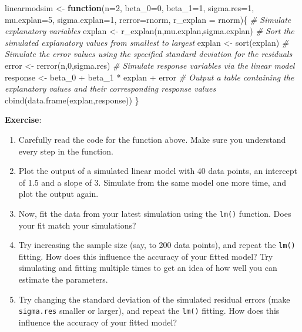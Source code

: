\documentclass[
]{book}
\newenvironment{Shaded}{\begin{snugshade}}{\end{snugshade}}
\newcommand{\AttributeTok}[1]{\textcolor[rgb]{0.77,0.63,0.00}{#1}}
\newcommand{\CommentTok}[1]{\textcolor[rgb]{0.56,0.35,0.01}{\textit{#1}}}
\newcommand{\ControlFlowTok}[1]{\textcolor[rgb]{0.13,0.29,0.53}{\textbf{#1}}}
\newcommand{\DecValTok}[1]{\textcolor[rgb]{0.00,0.00,0.81}{#1}}
\newcommand{\FunctionTok}[1]{\textcolor[rgb]{0.00,0.00,0.00}{#1}}
\newcommand{\NormalTok}[1]{#1}
\newcommand{\OtherTok}[1]{\textcolor[rgb]{0.56,0.35,0.01}{#1}}
\newcommand{\SpecialCharTok}[1]{\textcolor[rgb]{0.00,0.00,0.00}{#1}}
\providecommand{\tightlist}{%
  \setlength{\itemsep}{0pt}\setlength{\parskip}{0pt}}
\begin{document}
\begin{Shaded}
\begin{Highlighting}[]
\NormalTok{linearmodsim }\OtherTok{\textless{}{-}} \ControlFlowTok{function}\NormalTok{(}\AttributeTok{n=}\DecValTok{2}\NormalTok{, }\AttributeTok{beta\_0=}\DecValTok{0}\NormalTok{, }\AttributeTok{beta\_1=}\DecValTok{1}\NormalTok{, }\AttributeTok{sigma.res=}\DecValTok{1}\NormalTok{, }\AttributeTok{mu.explan=}\DecValTok{5}\NormalTok{, }\AttributeTok{sigma.explan=}\DecValTok{1}\NormalTok{, }\AttributeTok{rerror=}\NormalTok{rnorm, }\AttributeTok{r\_explan =}\NormalTok{ rnorm)\{}
  \CommentTok{\# Simulate explanatory variables}
\NormalTok{  explan }\OtherTok{\textless{}{-}} \FunctionTok{r\_explan}\NormalTok{(n,mu.explan,sigma.explan)}
  \CommentTok{\# Sort the simulated explanatory values from smallest to largest}
\NormalTok{  explan }\OtherTok{\textless{}{-}} \FunctionTok{sort}\NormalTok{(explan)}
  \CommentTok{\# Simulate the error values using the specified standard deviation for the residuals}
\NormalTok{  error }\OtherTok{\textless{}{-}} \FunctionTok{rerror}\NormalTok{(n,}\DecValTok{0}\NormalTok{,sigma.res)}
  \CommentTok{\# Simulate response variables via the linear model}
\NormalTok{  response }\OtherTok{\textless{}{-}}\NormalTok{ beta\_0 }\SpecialCharTok{+}\NormalTok{ beta\_1 }\SpecialCharTok{*}\NormalTok{ explan }\SpecialCharTok{+}\NormalTok{ error}
  \CommentTok{\# Output a table containing the explanatory values and their corresponding response values}
  \FunctionTok{cbind}\NormalTok{(}\FunctionTok{data.frame}\NormalTok{(explan,response))}
\NormalTok{\}}
\end{Highlighting}
\end{Shaded}

\textbf{Exercise}:

\begin{enumerate}
\def\labelenumi{\alph{enumi})}
\tightlist
\item
  Carefully read the code for the function above. Make sure you understand every step in the function.\\
\item
  Plot the output of a simulated linear model with 40 data points, an intercept of 1.5 and a slope of 3. Simulate from the same model one more time, and plot the output again.\\
\item
  Now, fit the data from your latest simulation using the \texttt{lm()} function. Does your fit match your simulations?\\
\item
  Try increasing the sample size (say, to 200 data points), and repeat the \texttt{lm()} fitting. How does this influence the accuracy of your fitted model? Try simulating and fitting multiple times to get an idea of how well you can estimate the parameters.\\
\item
  Try changing the standard deviation of the simulated residual errors (make \texttt{sigma.res} smaller or larger), and repeat the \texttt{lm()} fitting. How does this influence the accuracy of your fitted model?
\end{enumerate}
\end{document}
